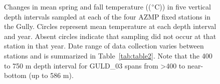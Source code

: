\documentclass[12pt]{article}\usepackage[]{graphicx}\usepackage[]{color}
\begin{document}
\begin{figure}[htb]

{\centering {} 

}

\caption{Changes in mean spring and fall temperature ((\(\degree\)C)) in five vertical depth intervals sampled at each of the four AZMP fixed stations in the Gully. Circles represent mean temperature at each depth interval and year. Absent circles indicate that sampling did not occur at that station in that year. Date range of data collection varies between stations and is summarized in Table~\ref{tab:table2}. Note that the 400 to 750 m depth interval for GULD\_03 spans from \textgreater400 to near-bottom (up to 586 m).}\label{fig:figure10}
\end{figure}
\clearpage
\end{document}
